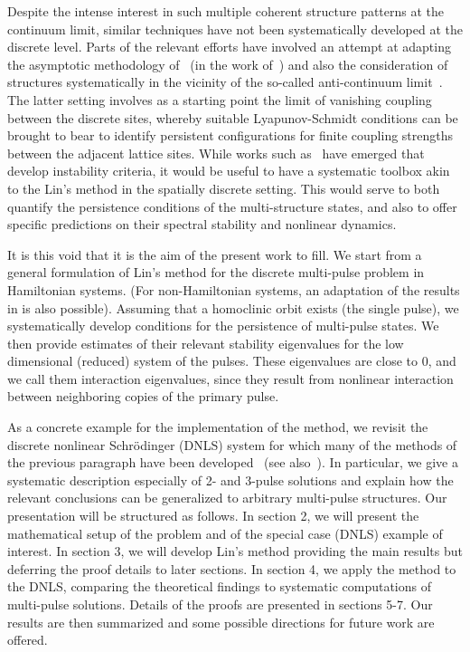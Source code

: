 \documentclass[12pt]{article}
\begin{document}
Despite the intense interest in such multiple coherent
structure patterns at the continuum limit, similar 
techniques have not been systematically developed
at the discrete level. Parts of the relevant efforts
have involved an attempt at adapting the
asymptotic methodology of~\cite{elphick} 
(in the work of~\cite{kevold}) and also the consideration
of structures systematically in the vicinity of the
so-called anti-continuum limit~\cite{Pelinovsky2005}.
The latter setting involves as a starting point the
limit of vanishing coupling between the discrete sites,
whereby suitable Lyapunov-Schmidt conditions can 
be brought to bear to identify persistent configurations
for finite coupling strengths between the adjacent
lattice sites. While works such as~\cite{Kapitula2001a}
have emerged that develop instability criteria, it would
be useful to have a systematic toolbox akin to the Lin's
method in the spatially discrete setting. This would
serve to both quantify the persistence conditions of
the multi-structure states, and also to offer specific
predictions on their spectral stability and nonlinear
dynamics.

It is this void that it is the aim of the present work
to fill. We start from a general formulation of Lin's method
for the discrete multi-pulse problem in Hamiltonian systems. (For non-Hamiltonian systems, an adaptation of the results in \cite{Sandstede1998} is also possible). Assuming that a homoclinic orbit exists (the single pulse), we systematically develop conditions for the persistence of multi-pulse states. We then provide estimates of their relevant stability eigenvalues for the low dimensional (reduced) system of the pulses. These eigenvalues are close to 0, and we call them interaction eigenvalues, since they result from nonlinear interaction between neighboring copies of the primary pulse.

As a concrete example for the implementation of the method, we revisit the
discrete nonlinear Schr{\"o}dinger (DNLS) system for which many of the methods of the previous paragraph have been developed~\cite{Kevrekidis2009} (see also~\cite{pelinovsky_2011}). In particular, we give a 
systematic description especially of 2- and 3-pulse solutions and explain how the relevant conclusions can be generalized
to arbitrary multi-pulse structures. 
Our presentation will be structured as follows.
In section 2, we will present the mathematical
setup of the problem and of the special case (DNLS)
example of interest. In section 3, we will develop
Lin's method providing the main results but deferring
the proof details to later sections. In section 4,
we apply the method to the DNLS, comparing the theoretical
findings to systematic computations of multi-pulse solutions.
Details of the proofs are presented in sections 5-7.
Our results are then summarized and some possible
directions for future work are offered.
\end{document}

